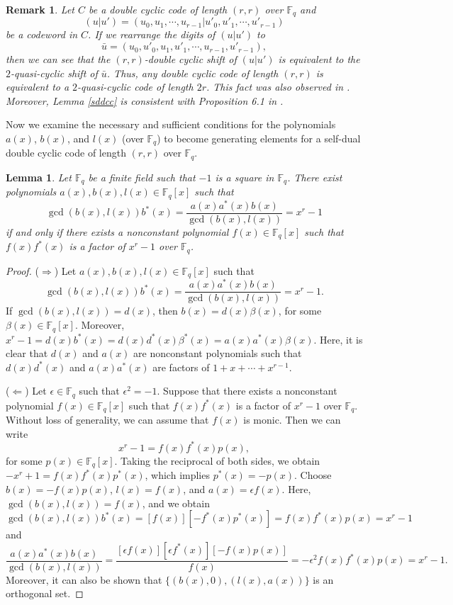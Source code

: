 \documentclass[12pt]{article}
\newtheorem{lemma}[theorem]{Lemma}
\newtheorem{remark}{Remark}
\begin{document}
	\begin{remark}
		Let $C$ be a double cyclic code of length $(r,r)$ over $\mathbb{F}_q$ and $$(u|u')=(u_0,u_1,\cdots,u_{r-1}|u'_0,u'_1,\cdots,u'_{r-1})$$ be a codeword in $C$. If we rearrange the digits of $(u|u')$ to $$\bar{u}=(u_0,u'_0,u_1,u'_1,\cdots,u_{r-1},u'_{r-1}),$$ then we can see that the $(r,r)$-double cyclic shift of $(u|u')$ is equivalent to the $2$-quasi-cyclic shift of $\bar{u}$. Thus, any double cyclic code of length $(r,r)$ is equivalent to a $2$-quasi-cyclic code of length $2r$. This fact was also observed in \cite{Abualrub2024}. Moreover, Lemma \ref{sddcc} is consistent with Proposition 6.1 in \cite{Ling2001}.
	\end{remark}
	
	Now we examine the necessary and sufficient conditions for the polynomials $a(x)$, $b(x)$, and $l(x)$ (over $\mathbb{F}_q$) to become generating elements for a self-dual double cyclic code of length $(r,r)$ over $\mathbb{F}_q$.
	\begin{lemma}\label{resgcd}
		Let $\mathbb{F}_q$ be a finite field such that $-1$ is a square in $\mathbb{F}_q$. There exist polynomials $a(x),b(x),l(x)\in\mathbb{F}_q[x]$ such that $$\gcd(b(x),l(x)) b^{*}(x) = \frac{a(x)a^{*}(x)b(x)}{\gcd(b(x),l(x))}=x^r-1$$ if and only if there exists a nonconstant polynomial $f(x)\in\mathbb{F}_q[x]$ such that $f(x)f^{*}(x)$ is a factor of $x^r-1$ over $\mathbb{F}_q$.
	\end{lemma}
	\begin{proof}
		($\Rightarrow$) Let $a(x),b(x),l(x)\in\mathbb{F}_q[x]$ such that $$\gcd(b(x),l(x)) b^{*}(x) = \frac{a(x)a^{*}(x)b(x)}{\gcd(b(x),l(x))}=x^r-1.$$ If $\gcd(b(x),l(x))=d(x)$, then $b(x)=d(x)\beta(x)$, for some $\beta(x)\in\mathbb{F}_q[x]$. Moreover, $x^r-1=d(x)b^{*}(x)=d(x)d^{*}(x) \beta^{*}(x)=a(x)a^{*}(x)\beta(x)$. Here, it is clear that $d(x)$ and $a(x)$ are nonconstant polynomials such that $d(x)d^{*}(x)$ and $a(x)a^{*}(x)$ are factors of $1+x+\cdots+x^{r-1}$.
		
		($\Leftarrow$) Let $\epsilon\in\mathbb{F}_q$ such that $\epsilon^2=-1$. Suppose that there exists a nonconstant polynomial $f(x)\in\mathbb{F}_q[x]$ such that $f(x)f^{*}(x)$ is a factor of $x^r-1$ over $\mathbb{F}_q$. Without loss of generality, we can assume that $f(x)$ is monic. Then we can write $$x^r-1=f(x)f^{*}(x)p(x),$$ for some $p(x)\in\mathbb{F}_q[x]$. Taking the reciprocal of both sides, we obtain $-x^r+1=f(x)f^{*}(x)p^{*}(x)$, which implies $p^{*}(x)=-p(x)$. Choose $b(x)=- f(x)p(x)$, $l(x)=f(x)$, and $a(x)=\epsilon f(x)$. Here, $\gcd(b(x),l(x))= f(x)$, and we obtain
		$$\gcd(b(x),l(x))b^{*}(x)=[f(x)][-f^{*}(x)p^{*}(x)]=f(x)f^{*}(x)p(x)=x^r-1$$ and $$\frac{a(x)a^{*}(x)b(x)}{\gcd(b(x),l(x))}=\frac{[\epsilon f(x)][\epsilon f^{*}(x)][- f(x)p(x)]}{ f(x)}=-\epsilon^2 f(x)f^{*}(x)p(x)=x^r-1.$$
		Moreover, it can also be shown that $\{(b(x),0),(l(x),a(x))\}$ is an orthogonal set.
	\end{proof}
	
\end{document}
